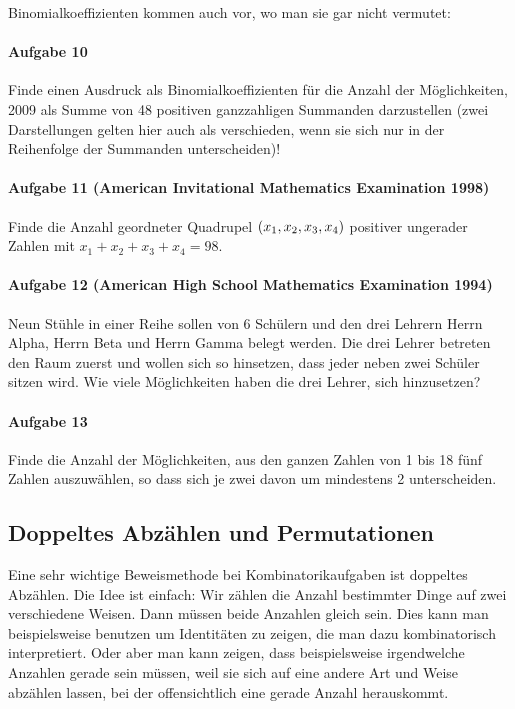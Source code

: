 \documentclass[11pt,a4paper]{article}
\begin{document}
Binomialkoeffizienten kommen auch vor, wo man sie gar nicht vermutet:

\paragraph{Aufgabe 10} 
Finde einen Ausdruck als Binomialkoeffizienten für die Anzahl der
Möglichkeiten, 2009 als Summe von 48 positiven ganzzahligen Summanden
darzustellen (zwei Darstellungen gelten hier auch als verschieden, wenn sie
sich nur in der Reihenfolge der Summanden unterscheiden)!

\paragraph{Aufgabe 11 (American Invitational Mathematics Examination 1998)} 
Finde die Anzahl geordneter Quadrupel $\left(x_{1}, x_{2}, x_{3}, x_{4}\right)$
positiver ungerader Zahlen mit $x_{1}+x_{2}+x_{3}+x_{4}=98$.

\paragraph{Aufgabe 12 (American High School Mathematics Examination 1994)} 
Neun Stühle in einer Reihe sollen von 6 Schülern und den drei Lehrern Herrn
Alpha, Herrn Beta und Herrn Gamma belegt werden. Die drei Lehrer betreten den
Raum zuerst und wollen sich so hinsetzen, dass jeder neben zwei Schüler sitzen
wird. Wie viele Möglichkeiten haben die drei Lehrer, sich hinzusetzen?

\paragraph{Aufgabe 13} 
Finde die Anzahl der Möglichkeiten, aus den ganzen Zahlen von 1 bis 18 fünf
Zahlen auszuwählen, so dass sich je zwei davon um mindestens 2 unterscheiden.

\subsection*{Doppeltes Abzählen und Permutationen}

Eine sehr wichtige Beweismethode bei Kombinatorikaufgaben ist doppeltes
Abzählen. Die Idee ist einfach: Wir zählen die Anzahl bestimmter Dinge auf
zwei verschiedene Weisen. Dann müssen beide Anzahlen gleich sein. Dies kann
man beispielsweise benutzen um Identitäten zu zeigen, die man dazu
kombinatorisch interpretiert. Oder aber man kann zeigen, dass beispielsweise
irgendwelche Anzahlen gerade sein müssen, weil sie sich auf eine andere Art
und Weise abzählen lassen, bei der offensichtlich eine gerade Anzahl
herauskommt.
\end{document}
